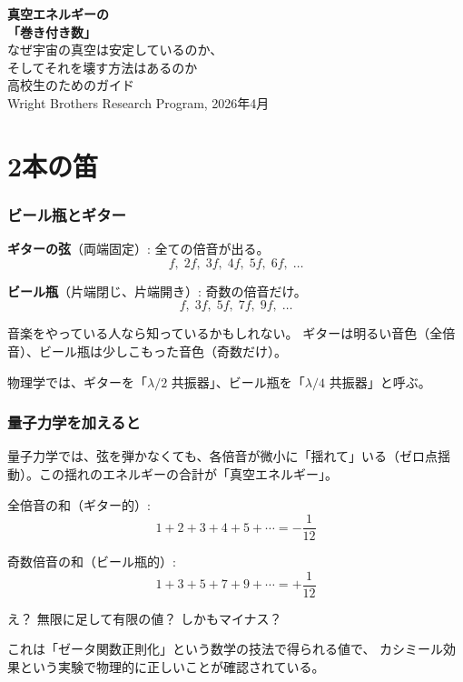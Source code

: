 \documentclass[12pt,a4paper]{article}
\begin{document}
\begin{center}
{\Huge\bfseries 真空エネルギーの}\\[0.2cm]
{\Huge\bfseries 「巻き付き数」}\\[0.8cm]
{\Large なぜ宇宙の真空は安定しているのか、}\\[0.2cm]
{\Large そしてそれを壊す方法はあるのか}\\[1cm]
{\large 高校生のためのガイド}\\[0.5cm]
{\large Wright Brothers Research Program, 2026年4月}
\end{center}

\vspace{0.5cm}
\tableofcontents
\newpage

\part{2本の笛}

\section{ビール瓶とギター}

\begin{storybox}[2つの楽器]
\textbf{ギターの弦}（両端固定）: 全ての倍音が出る。
$$f, \; 2f, \; 3f, \; 4f, \; 5f, \; 6f, \; \ldots$$

\textbf{ビール瓶}（片端閉じ、片端開き）: 奇数の倍音だけ。
$$f, \; 3f, \; 5f, \; 7f, \; 9f, \; \ldots$$

音楽をやっている人なら知っているかもしれない。
ギターは明るい音色（全倍音）、ビール瓶は少しこもった音色（奇数だけ）。

物理学では、ギターを「$\lambda/2$ 共振器」、ビール瓶を「$\lambda/4$ 共振器」と呼ぶ。
\end{storybox}

\section{量子力学を加えると}

\begin{mathbox}[真空の振動]
量子力学では、弦を弾かなくても、各倍音が微小に「揺れて」いる（ゼロ点揺動）。この揺れのエネルギーの合計が「真空エネルギー」。

全倍音の和（ギター的）:
$$1 + 2 + 3 + 4 + 5 + \cdots = -\frac{1}{12}$$

奇数倍音の和（ビール瓶的）:
$$1 + 3 + 5 + 7 + 9 + \cdots = +\frac{1}{12}$$

え？ 無限に足して有限の値？ しかもマイナス？

これは「ゼータ関数正則化」という数学の技法で得られる値で、
カシミール効果という実験で物理的に正しいことが確認されている。
\end{mathbox}
\end{document}
